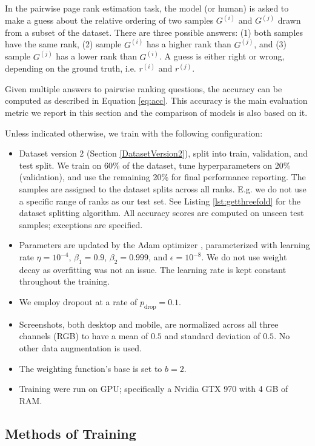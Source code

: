 In the pairwise page rank estimation task, the model (or human) is asked to make a guess about the relative ordering of two samples $G^{(i)}$ and $G^{(j)}$ drawn from a subset of the dataset. There are three possible answers: (1) both samples have the same rank, (2) sample $G^{(i)}$ has a higher rank than $G^{(j)}$, and (3) sample $G^{(j)}$ has a lower rank than $G^{(i)}$. A guess is either right or wrong, depending on the ground truth, i.e. $r^{(i)}$ and $r^{(j)}$.

Given multiple answers to pairwise ranking questions, the accuracy can be computed as described in Equation \ref{eq:acc}. This accuracy is the main evaluation metric we report in this section and the comparison of models is also based on it.

Unless indicated otherwise, we train with the following configuration:
\begin{itemize}
    \item Dataset version 2 (Section \ref{DatasetVersion2}), split into train, validation, and test split. We train on 60\% of the dataset, tune hyperparameters on 20\% (validation), and use the remaining 20\% for final performance reporting. The samples are assigned to the dataset splits across all ranks. E.g. we do not use a specific range of ranks as our test set. See Listing \ref{lst:getthreefold} for the dataset splitting algorithm. All accuracy scores are computed on unseen test samples; exceptions are specified.
    \item Parameters are updated by the Adam optimizer \cite{kingma2014:adam}, parameterized with learning rate $\eta=10^{-4}$, $\beta_1=0.9$, $\beta_2=0.999$, and $\epsilon=10^{-8}$. We do not use weight decay as overfitting was not an issue. The learning rate is kept constant throughout the training.
    \item We employ dropout \cite{srivastava2014:dropout} at a rate of $p_\text{drop}=0.1$.
    \item Screenshots, both desktop and mobile, are normalized across all three channels (RGB) to have a mean of $0.5$ and standard deviation of $0.5$. No other data augmentation is used.
    \item The weighting function's base is set to $b=2$.
    \item Training were run on GPU; specifically a Nvidia GTX 970 with 4 GB of RAM.
\end{itemize}

\subsection{Methods of Training}


